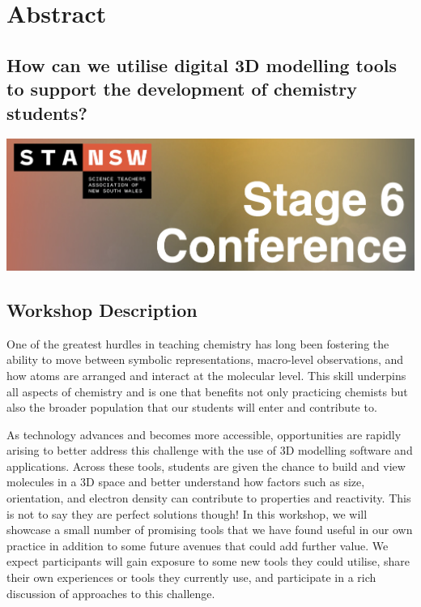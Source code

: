 \documentclass[
]{book}
\author{}
\date{\vspace{-2.5em}}
\begin{document}
{
\setcounter{tocdepth}{1}
\tableofcontents
}
\hypertarget{abstract}{%
\chapter{Abstract}\label{abstract}}

\hypertarget{how-can-we-utilise-digital-3d-modelling-tools-to-support-the-development-of-chemistry-students}{%
\section*{How can we utilise digital 3D modelling tools to support the development of chemistry students?}\label{how-can-we-utilise-digital-3d-modelling-tools-to-support-the-development-of-chemistry-students}}

\includegraphics[width=26.92in]{images/STA_Header}

\hypertarget{workshop-description}{%
\section*{Workshop Description}\label{workshop-description}}

One of the greatest hurdles in teaching chemistry has long been fostering the ability to move between symbolic representations, macro-level observations, and how atoms are arranged and interact at the molecular level. This skill underpins all aspects of chemistry and is one that benefits not only practicing chemists but also the broader population that our students will enter and contribute to.

As technology advances and becomes more accessible, opportunities are rapidly arising to better address this challenge with the use of 3D modelling software and applications. Across these tools, students are given the chance to build and view molecules in a 3D space and better understand how factors such as size, orientation, and electron density can contribute to properties and reactivity. This is not to say they are perfect solutions though! In this workshop, we will showcase a small number of promising tools that we have found useful in our own practice in addition to some future avenues that could add further value. We expect participants will gain exposure to some new tools they could utilise, share their own experiences or tools they currently use, and participate in a rich discussion of approaches to this challenge.
\end{document}
